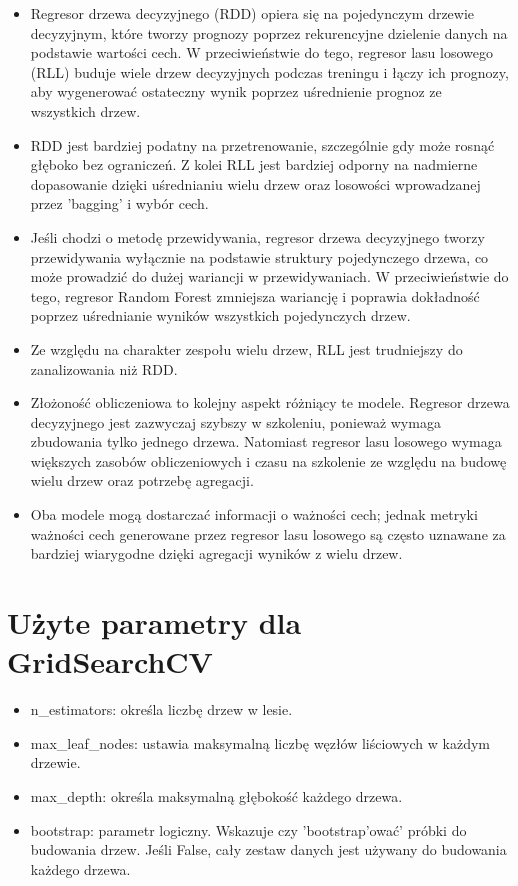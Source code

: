 \begin{itemize}

\item Regresor drzewa decyzyjnego (RDD) opiera się na pojedynczym drzewie decyzyjnym, które tworzy prognozy poprzez rekurencyjne dzielenie danych na podstawie wartości cech. W przeciwieństwie do tego, regresor lasu losowego (RLL) buduje wiele drzew decyzyjnych podczas treningu i łączy ich prognozy, aby wygenerować ostateczny wynik poprzez uśrednienie prognoz ze wszystkich drzew.

\item RDD jest bardziej podatny na przetrenowanie, szczególnie gdy może rosnąć głęboko bez ograniczeń. Z kolei RLL jest bardziej odporny na nadmierne dopasowanie dzięki uśrednianiu wielu drzew oraz losowości wprowadzanej przez 'bagging' i wybór cech.


\item Jeśli chodzi o metodę przewidywania, regresor drzewa decyzyjnego tworzy przewidywania wyłącznie na podstawie struktury pojedynczego drzewa, co może prowadzić do dużej wariancji w przewidywaniach. W przeciwieństwie do tego, regresor Random Forest zmniejsza wariancję i poprawia dokładność poprzez uśrednianie wyników wszystkich pojedynczych drzew.


\item Ze względu na charakter zespołu wielu drzew, RLL jest trudniejszy do zanalizowania niż RDD. 


\item Złożoność obliczeniowa to kolejny aspekt różniący te modele. Regresor drzewa decyzyjnego jest zazwyczaj szybszy w szkoleniu, ponieważ wymaga zbudowania tylko jednego drzewa. Natomiast regresor lasu losowego wymaga większych zasobów obliczeniowych i czasu na szkolenie ze względu na budowę wielu drzew oraz potrzebę agregacji.


\item Oba modele mogą dostarczać informacji o ważności cech; jednak metryki ważności cech generowane przez regresor lasu losowego są często uznawane za bardziej wiarygodne dzięki agregacji wyników z wielu drzew.
\end{itemize}

{}
\section*{Użyte parametry dla GridSearchCV \cite{url_RFF, url_grid_search}}
\vspace{-1.0em}

\begin{itemize}
\setlength\itemsep{-0.5em}
\item n\_estimators: określa liczbę drzew w lesie.
\item max\_leaf\_nodes: ustawia maksymalną liczbę węzłów liściowych w każdym drzewie.
\item max\_depth: określa maksymalną głębokość każdego drzewa.
\item bootstrap: parametr logiczny. Wskazuje czy 'bootstrap'ować' próbki do budowania drzew. Jeśli False, cały zestaw danych jest używany do budowania każdego drzewa.
\end{itemize}
